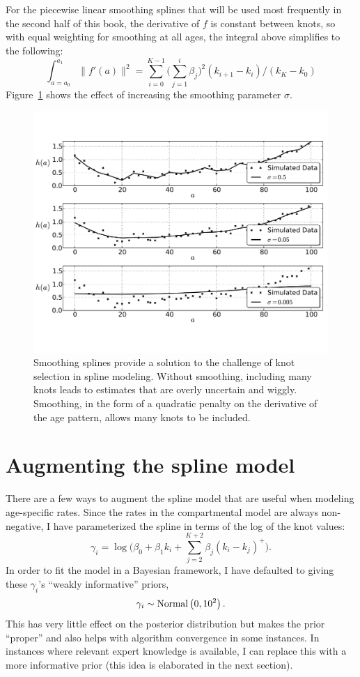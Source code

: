For the piecewise linear smoothing splines that will be used most
frequently in the second half of this book, the derivative of $f$ is
constant between knots, so with equal weighting for smoothing at all
ages, the integral above simplifies to the following:
\[
\int _{a=a_0} ^{a_1} \| f'(a) \|^2
 = \sum_{i=0} ^{K-1} \bigg(
\sum_{j=1} ^{i} \beta_j
\bigg)^2(k_{i+1}-k_i) / (k_K - k_0)
\]
Figure~\ref{smoothing-splines} shows the effect of increasing the
smoothing parameter $\sigma$.

\begin{figure}[h]
\begin{center}
\includegraphics[width=\textwidth]{smoothing-splines.pdf}
\caption{Smoothing splines provide a solution to the challenge of knot
  selection in spline modeling.  Without smoothing, including many
  knots leads to estimates that are overly uncertain and wiggly.
  Smoothing, in the form of a quadratic penalty on the derivative of
  the age pattern, allows many knots to be included.}
\label{smoothing-splines}
\end{center}
\end{figure}


\section{Augmenting the spline model}
There are a few ways to augment the spline model that are useful when
modeling age-specific rates. Since the rates in the compartmental
model are always non-negative, I have parameterized the spline in
terms of the log of the knot values:
\[
\gamma_i = \log\bigg(\beta_0 + \beta_1 k_i + \sum_{j=2}^{K+2} \beta_j (k_i-k_j)^+\bigg).
\]
In order to fit the model in a Bayesian framework, I have defaulted to
giving these $\gamma_i$'s ``weakly informative'' priors,
\[
\gamma_i \sim \operatorname{Normal}\left(0, 10^2\right).
\]
This has very little effect on the posterior distribution but makes
the prior ``proper'' and also helps with algorithm convergence in
some instances. In instances where relevant expert knowledge is
available, I can replace this with a more informative prior (this idea
is elaborated in the next section).


